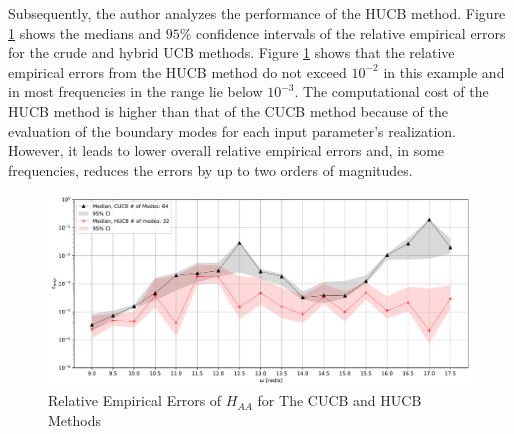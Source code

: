 Subsequently, the author analyzes the performance of the HUCB method.
Figure \ref{e_emp HUCB_A_A} shows the medians and $95\%$ confidence intervals of the relative empirical errors for the crude and hybrid UCB methods.
Figure \ref{e_emp HUCB_A_A} shows that the relative empirical errors from the HUCB method do not exceed $10^{-2}$ in this example and in most frequencies in the range lie below $10^{-3}$.
The computational cost of the HUCB method is higher than that of the CUCB method because of the evaluation of the boundary modes for each input parameter's realization.
However, it leads to lower overall relative empirical errors and, in some frequencies, reduces the errors by up to two orders of magnitudes.
\begin{figure}[H]
    \centering
    \includegraphics[width=1.0\textwidth]{
        plots/substructuring/plot_3.pdf
    }
    \caption{%
        Relative Empirical Errors of $H_{AA}$ for The CUCB and HUCB Methods
    }
    \label{e_emp HUCB_A_A}
\end{figure}

